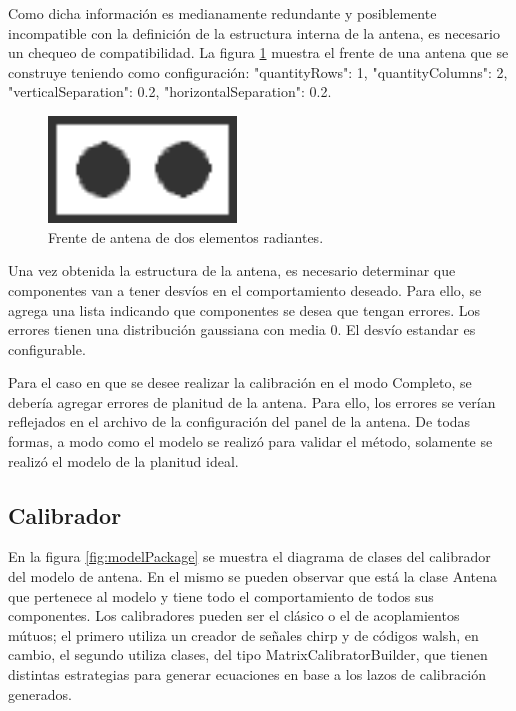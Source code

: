 Como dicha información es medianamente redundante y posiblemente incompatible con la definición de la estructura interna de 
la antena, es necesario un chequeo de compatibilidad. La figura \ref{fig:frontAntenna} muestra el frente de una antena que se 
construye teniendo como configuración: "quantityRows": 1, "quantityColumns": 2, "verticalSeparation": 0.2, 
"horizontalSeparation": 0.2.

\begin{figure}
 \centering
 \includegraphics[width=5cm]{gfx/FrontAntenna2.png}
 \caption{Frente de antena de dos elementos radiantes.}
 \label{fig:frontAntenna}
\end{figure}

Una vez obtenida la estructura de la antena, es necesario determinar que componentes van a tener desvíos en el comportamiento 
deseado. Para ello, se agrega una lista indicando que componentes se desea que tengan errores. Los errores tienen una 
distribución gaussiana con media 0. El desvío estandar es configurable.

Para el caso en que se desee realizar la calibración en el modo Completo, se debería agregar errores de planitud de la antena.
Para ello, los errores se verían reflejados en el archivo de la configuración del panel de la antena. De todas formas, a modo 
como el modelo se realizó para validar el método, solamente se realizó el modelo de la planitud ideal.

\subsection{Calibrador}

En la figura \ref{fig:modelPackage} se muestra el diagrama de clases del calibrador del modelo de antena. En el mismo se pueden 
observar que está la clase Antena que pertenece al modelo y tiene todo el comportamiento de todos sus componentes. Los 
calibradores pueden ser el clásico o el de acoplamientos mútuos; el primero utiliza un creador de señales chirp y de códigos
walsh, en cambio, el segundo utiliza clases, del tipo MatrixCalibratorBuilder, que tienen distintas estrategias para generar 
ecuaciones en base a los lazos de calibración generados.

